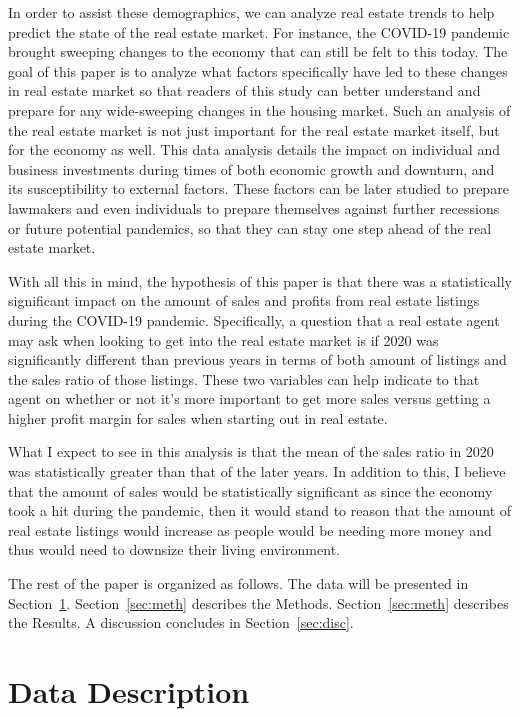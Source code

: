 \documentclass[12pt]{article}
\begin{document}
In order to assist these demographics, we can analyze real estate trends to help predict the state of the real estate market. For instance, the COVID-19 pandemic brought sweeping changes to the economy that can still be felt to this today. The goal of this paper is to analyze what factors specifically have led to these changes in real estate market so that readers of this study can better understand and prepare for any wide-sweeping changes in the housing market. 
Such an analysis of the real estate market is not just important for the real estate market itself, but for the economy as well. This data analysis details the impact on individual and business investments during times of both economic growth and downturn, and its susceptibility to external factors. These factors can be later studied to prepare lawmakers and even individuals to prepare themselves against further recessions or future potential pandemics, so that they can stay one step ahead of the real estate market.

With all this in mind, the hypothesis of this paper is that there was a statistically significant impact on the amount of sales and profits from real estate listings during the COVID-19 pandemic. Specifically, a question that a real estate agent may ask when looking to get into the real estate market is if 2020 was significantly different than previous years in terms of both amount of listings and the sales ratio of those listings. These two variables can help indicate to that agent on whether or not it's more important to get more sales versus getting a higher profit margin for sales when starting out in real estate.

What I expect to see in this analysis is that the mean of the sales ratio in 2020 was statistically greater than that of the later years. In addition to this, I believe that the amount of sales would be statistically significant as since the economy took a hit during the pandemic, then it would stand to reason that the amount of real estate listings would increase as people would be needing more money and thus would need to downsize their living environment.

The rest of the paper is organized as follows. The data will be presented in 
Section~\ref{sec:data}. Section~\ref{sec:meth} describes the Methods. Section~\ref{sec:meth} describes the Results. A discussion concludes in Section~\ref{sec:disc}.


\section{Data Description}
\label{sec:data}
\end{document}
